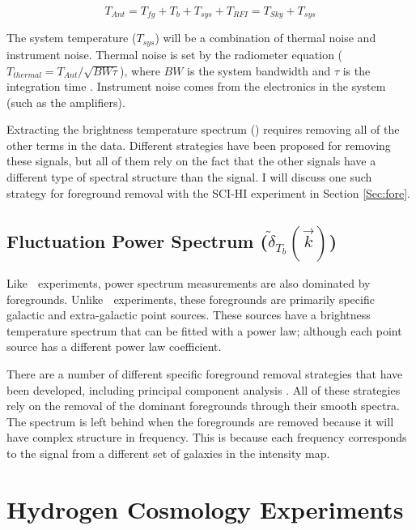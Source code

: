 \begin{equation} \label{Eq:T_ant_sky}
T_{Ant} = T_{fg} + T_b +T_{sys}+T_{RFI} = T_{Sky} + T_{sys}
\end{equation}

The system temperature ($T_{sys}$) will be a combination of thermal noise and instrument noise. Thermal noise is set by the radiometer equation ($T_{thermal} = T_{Ant}/\sqrt{BW \tau}$), where $BW$ is the system bandwidth and $\tau$ is the integration time \cite{carroll2007}. Instrument noise comes from the electronics in the system (such as the amplifiers). 

Extracting the \cm brightness temperature spectrum (\tb) requires removing all of the other terms in the data. Different strategies have been proposed for removing these signals, but all of them rely on the fact that the other signals have a different type of spectral structure than the \cm signal. I will discuss one such strategy for foreground removal with the SCI-HI experiment in Section \ref{Sec:fore}. 


\subsection{Fluctuation Power Spectrum ($ \tilde{ \delta}_{T_b}  ( \vec{k} )$)}

Like \avgdtb$\;$ experiments, power spectrum measurements are also dominated by foregrounds. Unlike \avgdtb$\;$ experiments, these foregrounds are primarily specific galactic and extra-galactic point sources. These sources have a brightness temperature spectrum that can be fitted with a power law; although each point source has a different power law coefficient. 

There are a number of different specific foreground removal strategies that have been developed, including principal component analysis \cite{masui_2012}\cite{switzer_2013}. All of these strategies rely on the removal of the dominant foregrounds through their smooth spectra. The \cm spectrum is left behind when the foregrounds are removed because it will have complex structure in frequency. This is because each frequency corresponds to the signal from a different set of galaxies in the intensity map. 



\section{Hydrogen \cm Cosmology Experiments} \label{Sec:cm_expts}

